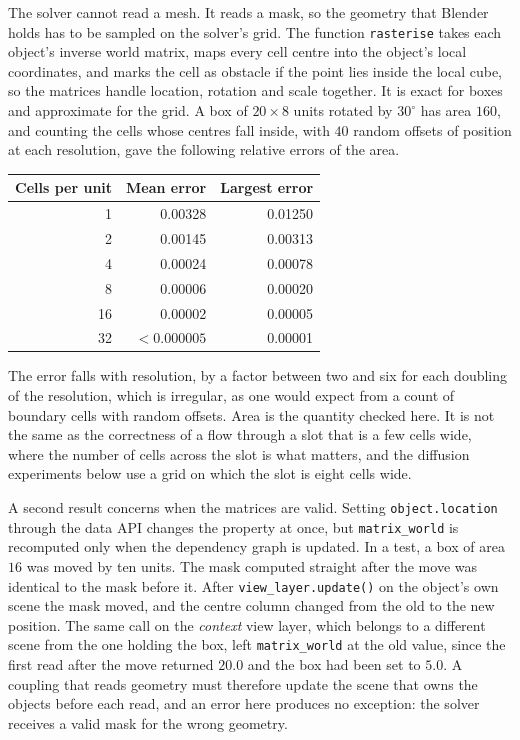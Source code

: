 The solver cannot read a mesh. It reads a mask, so the geometry that Blender holds has to be sampled on the solver's grid. The function \texttt{rasterise} takes each object's inverse world matrix, maps every cell centre into the object's local coordinates, and marks the cell as obstacle if the point lies inside the local cube, so the matrices handle location, rotation and scale together. It is exact for boxes and approximate for the grid. A box of $20\times 8$ units rotated by $30^\circ$ has area $160$, and counting the cells whose centres fall inside, with $40$ random offsets of position at each resolution, gave the following relative errors of the area.

\begin{center}
\small
\begin{tabular}{rrr}
\toprule
Cells per unit & Mean error & Largest error\\
\midrule
1 & 0.00328 & 0.01250\\
2 & 0.00145 & 0.00313\\
4 & 0.00024 & 0.00078\\
8 & 0.00006 & 0.00020\\
16 & 0.00002 & 0.00005\\
32 & $<0.000005$ & 0.00001\\
\bottomrule
\end{tabular}
\end{center}

The error falls with resolution, by a factor between two and six for each doubling of the resolution, which is irregular, as one would expect from a count of boundary cells with random offsets. Area is the quantity checked here. It is not the same as the correctness of a flow through a slot that is a few cells wide, where the number of cells across the slot is what matters, and the diffusion experiments below use a grid on which the slot is eight cells wide.

A second result concerns when the matrices are valid. Setting \texttt{object.location} through the data API changes the property at once, but \texttt{matrix\_world} is recomputed only when the dependency graph is updated. In a test, a box of area $16$ was moved by ten units. The mask computed straight after the move was identical to the mask before it. After \texttt{view\_layer.update()} on the object's own scene the mask moved, and the centre column changed from the old to the new position. The same call on the \emph{context} view layer, which belongs to a different scene from the one holding the box, left \texttt{matrix\_world} at the old value, since the first read after the move returned $20.0$ and the box had been set to $5.0$. A coupling that reads geometry must therefore update the scene that owns the objects before each read, and an error here produces no exception: the solver receives a valid mask for the wrong geometry.

